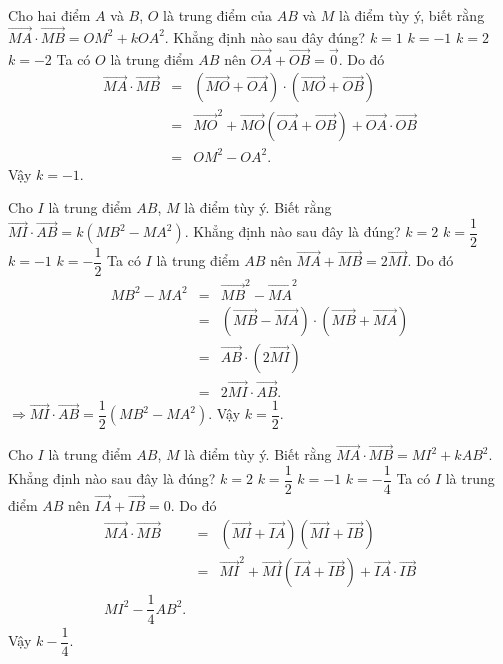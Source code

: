 \begin{ex}%
	Cho hai điểm $A$ và $B$, $O$ là trung điểm của $AB$ và $M$ là điểm tùy ý, biết rằng $\overrightarrow{MA}\cdot\overrightarrow{MB}=OM^2+kOA^2$. Khẳng định nào sau đây đúng?
	\choice
	{$k=1$}
	{\True $k=-1$}
	{$k=2$}
	{$k=-2$}
	\loigiai
	{
		Ta có $O$ là trung điểm $AB$ nên $\overrightarrow{OA}+\overrightarrow{OB}=\overrightarrow{0}$. Do đó
		\begin{eqnarray*}
			\overrightarrow{MA}\cdot\overrightarrow{MB}
			& = & \left(\overrightarrow{MO}+\overrightarrow{OA}\right)\cdot\left(\overrightarrow{MO}+\overrightarrow{OB}\right)\\
			& = & \overrightarrow{MO}^2+\overrightarrow{MO}\left(\overrightarrow{OA}+\overrightarrow{OB}\right)+\overrightarrow{OA}\cdot\overrightarrow{OB}\\
			& = & OM^2-OA^2.
		\end{eqnarray*}
		Vậy $k=-1$.
	}
\end{ex}

\begin{ex}%
	Cho $I$ là trung điểm $AB$, $M$ là điểm tùy ý. Biết rằng $\overrightarrow{MI}\cdot\overrightarrow{AB}=k\left(MB^2-MA^2\right)$. Khẳng định nào sau đây là đúng?
	\choice
	{$k=2$}
	{\True $k=\dfrac{1}{2}$}
	{$k=-1$}
	{$k=-\dfrac{1}{2}$}
	\loigiai
	{
		Ta có $I$ là trung điểm $AB$ nên $\overrightarrow{MA}+\overrightarrow{MB}=2\overrightarrow{MI}$. Do đó
		\begin{eqnarray*}
			MB^2-MA^2
			& = & \overrightarrow{MB}^2-\overrightarrow{MA}^2\\
			& = & \left(\overrightarrow{MB}-\overrightarrow{MA}\right)\cdot\left(\overrightarrow{MB}+\overrightarrow{MA}\right)\\
			& = & \overrightarrow{AB}\cdot\left(2\overrightarrow{MI}\right)\\
			& = & 2\overrightarrow{MI}\cdot\overrightarrow{AB}.
		\end{eqnarray*}
		$\Rightarrow \overrightarrow{MI}\cdot\overrightarrow{AB}=\dfrac{1}{2}\left(MB^2-MA^2\right)$. Vậy $k=\dfrac{1}{2}$.
	}
\end{ex}

\begin{ex}%
	Cho $I$ là trung điểm $AB$, $M$ là điểm tùy ý. Biết rằng $\overrightarrow{MA}\cdot\overrightarrow{MB}=MI^2+kAB^2$. Khẳng định nào sau đây là đúng?
	\choice
	{$k=2$}
	{$k=\dfrac{1}{2}$}
	{$k=-1$}
	{\True $k=-\dfrac{1}{4}$}
	\loigiai
	{
		Ta có $I$ là trung điểm $AB$ nên $\overrightarrow{IA}+\overrightarrow{IB}=0$. Do đó
		\begin{eqnarray*}
			\overrightarrow{MA}\cdot\overrightarrow{MB}
			& = & \left(\overrightarrow{MI}+\overrightarrow{IA}\right)\left(\overrightarrow{MI}+\overrightarrow{IB}\right)\\
			& = & \overrightarrow{MI}^2+\overrightarrow{MI}\left(\overrightarrow{IA}+\overrightarrow{IB}\right)+\overrightarrow{IA}\cdot\overrightarrow{IB}\\
			MI^2-\dfrac{1}{4}AB^2.
		\end{eqnarray*}
		Vậy $k-\dfrac{1}{4}$.
	}
\end{ex}


